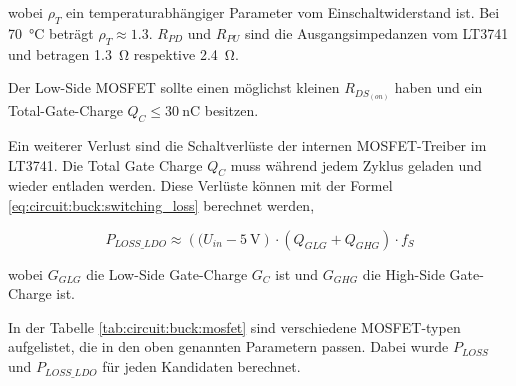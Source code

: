 wobei $\rho_T$ ein temperaturabh\"angiger Parameter vom Einschaltwiderstand ist.
Bei \SI{70}{\celsius} betr\"agt $\rho_T \approx 1.3$. $R_{PD}$ und $R_{PU}$ sind
die  Ausgangsimpedanzen  vom  LT3741  und  betragen  \SI{1.3}{\ohm}   respektive
\SI{2.4}{\ohm}.

Der  Low-Side MOSFET sollte einen m\"oglichst kleinen $R_{DS_{(on)}}$ haben  und
ein    Total-Gate-Charge    $Q_C    \leq    \SI{30}{\nano\coulomb}$    besitzen.

Ein  weiterer Verlust sind die Schaltverl\"uste der internen  MOSFET-Treiber  im
LT3741. Die Total Gate Charge $Q_C$ muss  w\"ahrend  jedem  Zyklus  geladen  und
wieder   entladen   werden.   Diese   Verl\"uste   k\"onnen   mit   der   Formel
\ref{eq:circuit:buck:switching_loss} berechnet werden,

\begin{equation}
    P_{LOSS\_LDO} \approx \left( (U_{in} - \SI{5}{\volt} \right) \cdot \left( Q_{GLG} + Q_{GHG} \right) \cdot f_S
    \label{eq:circuit:buck:switching_loss}
\end{equation}

wobei $G_{GLG}$ die  Low-Side  Gate-Charge $G_C$ ist und $G_{GHG}$ die High-Side
Gate-Charge ist.

In  der  Tabelle  \ref{tab:circuit:buck:mosfet}  sind  verschiedene MOSFET-typen
aufgelistet, die in den oben genannten Parametern passen. Dabei wurde $P_{LOSS}$
und $P_{LOSS\_LDO}$ f\"ur jeden Kandidaten berechnet.

